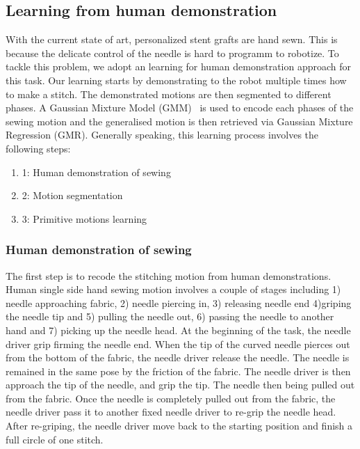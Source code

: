 \subsection{Learning from human demonstration}
With the current state of art, personalized stent grafts are hand sewn. This is because the delicate control of the needle is hard to programm to robotize. To tackle this problem, we adopt an learning for human demonstration approach for this task. Our learning starts by demonstrating to the robot multiple times how to make a stitch. The demonstrated motions are then segmented to different phases. A Gaussian Mixture Model (GMM)~\cite{cohn1996active} is used to encode each phases of the sewing motion and the generalised motion is then retrieved via Gaussian Mixture Regression (GMR). Generally speaking, this learning process involves the following steps:

\begin{enumerate}
\item{1}: Human demonstration of sewing
\item{2}: Motion segmentation
\item{3}: Primitive motions learning
\end{enumerate}

\subsubsection{Human demonstration of sewing}
The first step is to recode the stitching motion from human demonstrations. Human single side hand sewing motion involves a couple of stages including 1) needle approaching fabric, 2) needle piercing in, 3) releasing needle end 4)griping the needle tip and 5) pulling the needle out, 6) passing the needle to another hand and 7) picking up the needle head. At the beginning of the task, the needle driver grip firming the needle end. When the tip of the curved needle pierces out from the bottom of the fabric, the needle driver release the needle. The needle is remained in the same pose by the friction of the fabric. The needle driver is then approach the tip of the needle, and grip the tip. The needle then being pulled out from the fabric. Once the needle is completely pulled out from the fabric, the needle driver pass it to another fixed needle driver to re-grip the needle head. After re-griping, the needle driver move back to the starting position and finish a full circle of one stitch.

